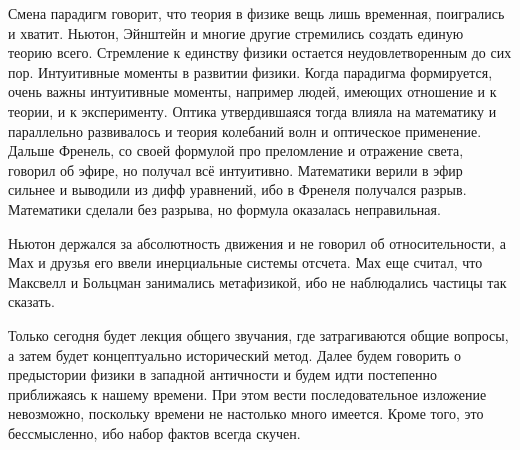 \documentclass[a4paper, 12pt]{article}
\begin{document}
Смена парадигм говорит, что теория в физике вещь лишь временная, 
поигрались и хватит. Ньютон, Эйнштейн и многие другие стремились 
создать единую теорию всего. Стремление к единству физики остается 
неудовлетворенным до сих пор. Интуитивные моменты в развитии 
физики. Когда парадигма формируется, очень важны интуитивные 
моменты, например людей, имеющих отношение и к теории, 
и к эксперименту. Оптика утвердившаяся тогда влияла на математику 
и параллельно развивалось и теория колебаний волн и оптическое 
применение. Дальше Френель, со своей формулой про преломление 
и отражение света, говорил об эфире, но получал всё интуитивно. 
Математики верили в эфир сильнее и выводили из дифф уравнений, ибо 
в Френеля получался разрыв. Математики сделали без разрыва, но 
формула оказалась неправильная.

Ньютон держался за абсолютность движения и не говорил об 
относительности, а Мах и друзья его ввели инерциальные системы 
отсчета. Мах еще считал, что Максвелл и Больцман занимались 
метафизикой, ибо не наблюдались частицы так сказать.

Только сегодня будет лекция общего звучания, где затрагиваются 
общие вопросы, а затем будет концептуально исторический метод. 
Далее будем говорить о предыстории физики в западной античности 
и будем идти постепенно приближаясь к нашему времени. При этом 
вести последовательное изложение невозможно, поскольку времени не 
настолько много имеется. Кроме того, это бессмысленно, ибо набор 
фактов всегда скучен.

\end{document}
